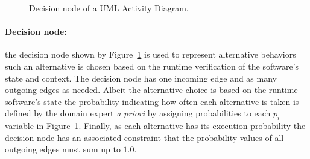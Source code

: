 \begin{figure}[h!]
\begin{center}
\end{center}
\caption{Decision node of a UML Activity Diagram.}
\label{fig:decision_AD}
\end{figure}

\paragraph{Decision node: \label{par:decisionNodeModeling}} 
the decision node shown by Figure~\ref{fig:decision_AD} is used to represent alternative behaviors such an alternative is chosen based
on the runtime verification of the software's state and context. The decision node
has one incoming edge and as many outgoing edges as needed. Albeit the
alternative choice is based on the runtime software's state the probability indicating
how often each alternative is taken is defined by the domain expert \emph{a
priori} by assigning probabilities to each $p_i$ variable in
Figure~\ref{fig:decision_AD}.
Finally, as each alternative has its execution probability the
decision node has an associated constraint that the probability values of all
outgoing edges must sum up to $1.0$. 


